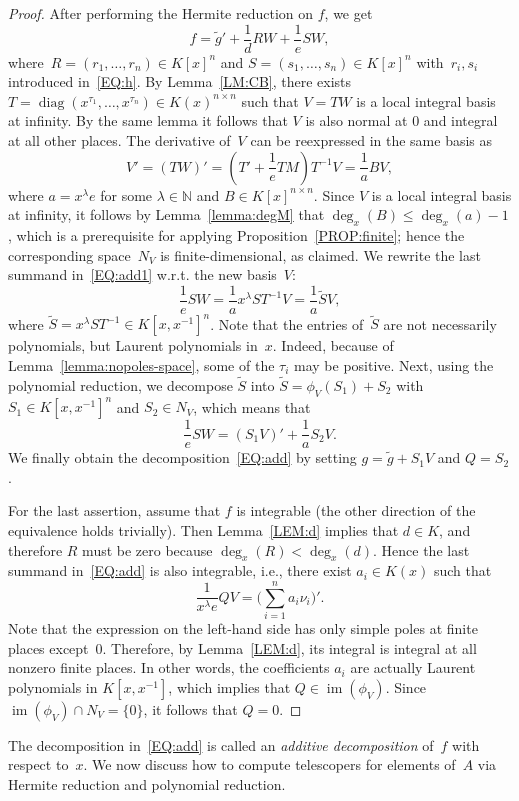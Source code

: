 \documentclass{sig-alternate}
\newcommand{\bN}{ {\mathbb N}}
\def\im{\operatorname{im}}
\def\diag{\operatorname{diag}}
\begin{document}
\begin{proof}
After performing the Hermite reduction on $f$, we get
\begin{equation}\label{EQ:add1}
  f = \tilde{g}' + \frac{1}{d} RW + \frac{1}{e} SW,
\end{equation}
where~$R = (r_1, \ldots, r_n)\in K[x]^n$ and $S = (s_1, \ldots, s_n)\in K[x]^n$
with~$r_i, s_i$ introduced in~\eqref{EQ:h}. By Lemma~\ref{LM:CB}, there exists
$T = \diag(x^{\tau_1}, \ldots, x^{\tau_n}) \in K(x)^{n\times n}$ such that $V = TW$
is a local integral basis at infinity. By the same lemma it follows
that $V$ is also normal at $0$ and integral at all other places.
The derivative of~$V$ can be reexpressed in the same basis as
\[
  V' = (TW)' = \left(T' + \frac{1}{e}TM\right)T^{-1}V = \frac{1}{a}BV,
\]
where $a=x^\lambda e$ for some $\lambda\in \bN$ and $B\in K[x]^{n\times n}$.
Since $V$ is a local integral basis at infinity, it follows by
Lemma~\ref{lemma:degM} that $\deg_x(B) \leq \deg_x(a)-1$, which is a
prerequisite for applying Proposition~\ref{PROP:finite}; hence the
corresponding space~$N_V$ is finite-dimensional, as claimed.
We rewrite the last summand in~\eqref{EQ:add1} w.r.t. the new basis~$V$:
\[
  \frac{1}{e} SW = \frac{1}{a} x^\lambda ST^{-1}V= \frac{1}{a} \tilde{S}V,
\]
where $\tilde{S} = x^\lambda S T^{-1} \in K[x,x^{-1}]^n$. Note that the entries
of~$\tilde{S}$ are not necessarily polynomials, but Laurent polynomials in~$x$.
Indeed, because of Lemma~\ref{lemma:nopoles-space}, some of the $\tau_i$
may be positive. Next, using the polynomial reduction, we decompose
$\tilde{S}$ into $\tilde{S} = \phi_{V}(S_1) + S_2$ with
$S_1\in K[x,x^{-1}]^n$ and $S_2\in N_V$, which means that
\[
  \frac{1}{e} SW = (S_1 V)' + \frac{1}{a} S_2 V.
\]
We finally obtain the decomposition~\eqref{EQ:add} by setting
$g = \tilde{g} + S_1 V$ and $Q = S_2$.

For the last assertion, assume that $f$ is integrable (the other direction of
the equivalence holds trivially). Then Lemma~\ref{LEM:d} implies that $d\in K$,
and therefore $R$ must be zero because $\deg_x(R) < \deg_x(d)$. Hence the last
summand in~\eqref{EQ:add} is also integrable, i.e., there exist $a_i\in K(x)$
such that
\[
  \frac{1}{x^\lambda e} QV = \biggl(\sum_{i=1}^n a_i \nu_i\biggr)'.
\]
Note that the expression on the left-hand side has only simple poles at finite
places except~$0$. Therefore, by Lemma~\ref{LEM:d}, its integral is integral
at all nonzero finite places. In other words, the coefficients $a_i$ are actually
Laurent polynomials in $K[x,x^{-1}]$, which implies that $Q \in \im(\phi_V)$.
Since $\im(\phi_V) \cap N_V = \{0\}$, it follows that $Q=0$.
\end{proof}
The decomposition in~\eqref{EQ:add} is called an \emph{additive decomposition} of~$f$ with respect to~$x$.
We now discuss how to compute telescopers for elements of~$A$ via Hermite reduction and
polynomial reduction.
\end{document}
